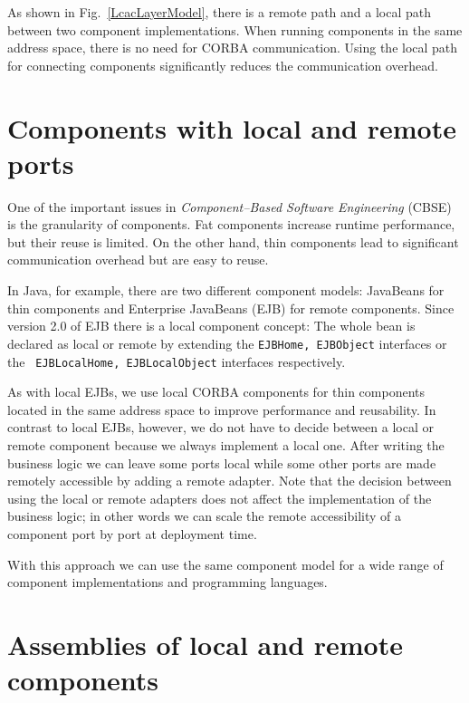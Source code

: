 \noindent
As shown in Fig.~\ref{LcacLayerModel}, there is a remote path and a local path
between two component implementations. When running components in the same
address space, there is no need for CORBA communication. Using the local path
for connecting components significantly reduces the communication overhead.


\section{Components with local and remote ports}

One of the important issues in {\it Component--Based Software Engineering}
(CBSE) \cite{CBSE2001} is the granularity of components. Fat components increase
runtime performance, but their reuse is limited. On the other hand, thin
components lead to significant communication overhead but are easy to reuse.

In Java, for example, there are two different component models: JavaBeans
\cite{Englander1997} for thin components and Enterprise JavaBeans (EJB)
\cite{EJBSpecificationV2_0} for remote components. Since version 2.0 of EJB
there is a local component concept: The whole bean is declared as local or
remote by extending the {\tt EJBHome, EJBObject} interfaces or the {\tt
EJBLocalHome, EJBLocalObject} interfaces respectively.

As with local EJBs, we use local CORBA components for thin components located in
the same address space to improve performance and reusability. In contrast to
local EJBs, however, we do not have to decide between a local or remote
component because we always implement a local one. After writing the business
logic we can leave some ports local while some other ports are made remotely
accessible by adding a remote adapter. Note that the decision between using the
local or remote adapters does not affect the implementation of the business
logic; in other words we can scale the remote accessibility of a component port
by port at deployment time.

With this approach we can use the same component model for a wide range of
component implementations and programming languages.


\section{Assemblies of local and remote components}

